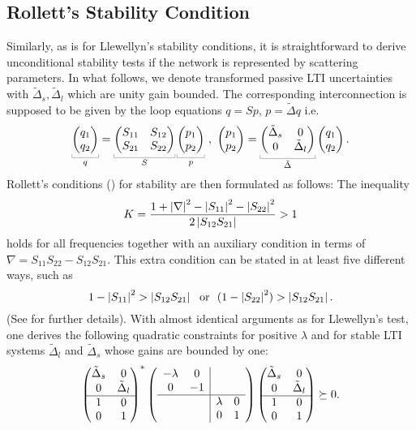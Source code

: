 \subsection{Rollett's Stability Condition}\label{sec:rollett}
Similarly, as is for Llewellyn's stability conditions, it is straightforward to derive 
unconditional stability {tests if} the network is represented by scattering parameters. 
In what follows, we denote transformed passive LTI uncertainties with $\tilde{\Delta}_{s}, 
\tilde{\Delta}_l$ which are unity gain bounded. The corresponding interconnection is 
supposed to be given by the loop equations
$q = S p$, $p=\tilde{\Delta} q$ i.e.
\begin{equation}
\underbracket[0.2pt]{\pmatr{q_1\\q_2}}_{q}=
\underbracket[0.2pt]{\pmatr{S_{11} &S_{12}\\S_{21} &S_{22}}}_{S}
\underbracket[0.2pt]{\pmatr{p_1\\p_2}}_{p} \ , \ \pmatr{p_1\\p_2}=
\underbracket[0.2pt]{\pmatr{\tilde{\Delta}_s&0\\0&\tilde{\Delta}_l}}_{\tilde{\Delta}} \pmatr{q_1\\q_2}.
\label{eq:rolic}
\end{equation}
Rollett's conditions (\cite{stern,rollett,kurokawa}) for stability are then
formulated as follows: The inequality
\begin{equation}
K = \frac{1+\displaystyle \left|\nabla\right|^2-\displaystyle \left|S_{11}\right|^2-\displaystyle \left|S_{22}\right|^2}{2\displaystyle \left|S_{12}S_{21}\right|} > 1
\end{equation}
holds for all frequencies together with an auxiliary condition in terms of $\nabla = S_{11}S_{22}-
S_{12}S_{21}$. This extra condition can be stated in at least five different ways, such as 
\[ 1-\displaystyle \left|S_{11}\right|^2 > \displaystyle \left|S_{12}S_{21}\right|\ \text{ or } \ (1-\displaystyle \left|S_{22}\right|^2)> \displaystyle \left|S_{12}S_{21}\right|. \] 
(See \cite{edsin} for further details). With almost identical arguments as for Llewellyn's test, 
one derives the following quadratic constraints {for positive $\lambda$} and for stable LTI systems 
$\tilde{\Delta}_l$ and $\tilde{\Delta}_s$ whose gains are bounded by one:
\[
\begin{pmatrix}\tilde{\Delta}_s &0\\0 &\tilde{\Delta}_l\\\hline 1 &0\\0 &1\end{pmatrix}^*\left(\begin{array}{cc|cc}
-\lambda  &0  & 				& \\
0	  			&-1  &  				&\\ \hline
	  			& 	&\lambda 	&0\\
	  			& 	&0 				&1
	  			\end{array}\right)
\begin{pmatrix}\tilde{\Delta}_s &0\\0 &\tilde{\Delta}_l\\\hline 1 &0\\0 &1\end{pmatrix} \succeq 0.
\]

